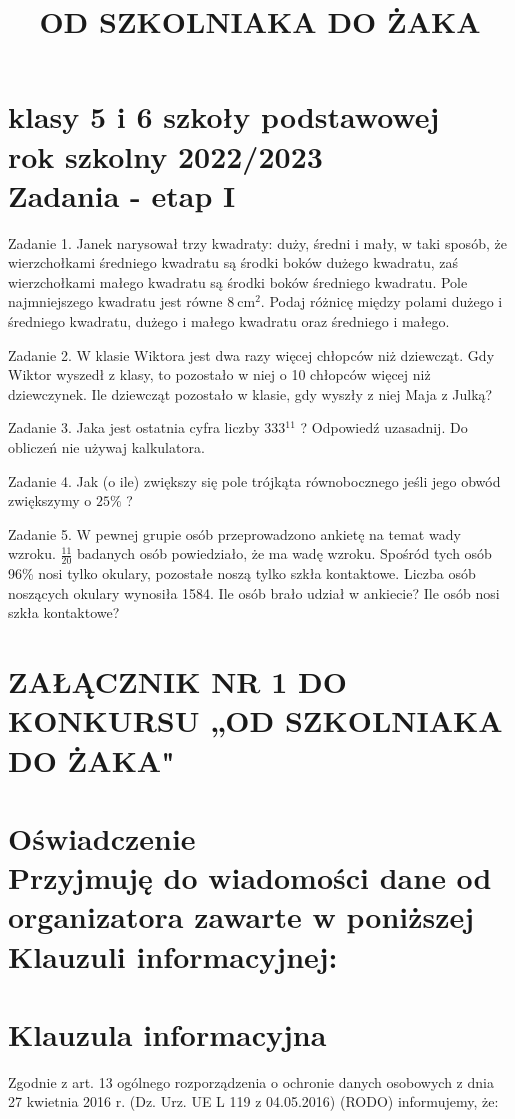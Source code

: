 \documentclass[10pt]{article}
\title{OD SZKOLNIAKA DO ŻAKA }
\author{}
\date{}
\begin{document}
\maketitle
\section*{klasy 5 i 6 szkoły podstawowej \\
 rok szkolny 2022/2023 \\
 Zadania - etap I}
Zadanie 1. Janek narysował trzy kwadraty: duży, średni i mały, w taki sposób, że wierzchołkami średniego kwadratu są środki boków dużego kwadratu, zaś wierzchołkami małego kwadratu są środki boków średniego kwadratu. Pole najmniejszego kwadratu jest równe \(8 \mathrm{~cm}^{2}\). Podaj różnicę między polami dużego i średniego kwadratu, dużego i małego kwadratu oraz średniego i małego.

Zadanie 2. W klasie Wiktora jest dwa razy więcej chłopców niż dziewcząt. Gdy Wiktor wyszedł z klasy, to pozostało w niej o 10 chłopców więcej niż dziewczynek. Ile dziewcząt pozostało w klasie, gdy wyszły z niej Maja z Julką?

Zadanie 3. Jaka jest ostatnia cyfra liczby \(333{ }^{11}\) ? Odpowiedź uzasadnij. Do obliczeń nie używaj kalkulatora.

Zadanie 4. Jak (o ile) zwiększy się pole trójkąta równobocznego jeśli jego obwód zwiększymy o \(25 \%\) ?

Zadanie 5. W pewnej grupie osób przeprowadzono ankietę na temat wady wzroku. \(\frac{11}{20}\) badanych osób powiedziało, że ma wadę wzroku. Spośród tych osób 96\% nosi tylko okulary, pozostałe noszą tylko szkła kontaktowe. Liczba osób noszących okulary wynosiła 1584. Ile osób brało udział w ankiecie? Ile osób nosi szkła kontaktowe?

\section*{ZAŁĄCZNIK NR 1 DO KONKURSU „OD SZKOLNIAKA DO ŻAKA"}
\section*{Oświadczenie \\
 Przyjmuję do wiadomości dane od organizatora zawarte w poniższej Klauzuli informacyjnej:}
\section*{Klauzula informacyjna}
Zgodnie z art. 13 ogólnego rozporządzenia o ochronie danych osobowych z dnia 27 kwietnia 2016 r. (Dz. Urz. UE L 119 z 04.05.2016) (RODO) informujemy, że:
\end{document}

